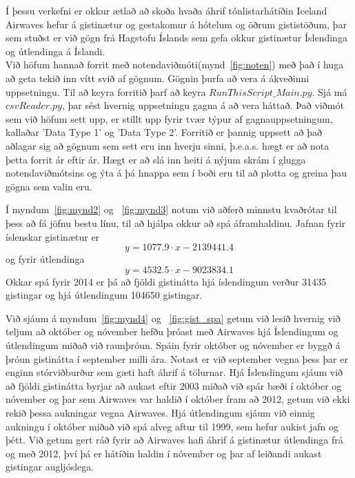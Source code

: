\documentclass[11pt,a4paper]{amsart}
\theoremstyle{plain}
\theoremstyle{definition}
\theoremstyle{remark}
\begin{document}



Í þessu verkefni er okkur ætlað að skoða hvaða áhrif tónlistarhátíðin Iceland Airwaves hefur á gistinætur og gestakomur á hótelum og öðrum gististöðum, þar sem stuðst er við gögn frá Hagstofu Íslands sem gefa okkur gistinætur Íslendinga og útlendinga á Íslandi.\\

Við höfum hannað forrit með notendaviðmóti(mynd~\ref{fig:noten}) með það í huga að geta tekið inn vítt svið af gögnum. Gögnin þurfa að vera á ákveðinni uppsetningu. Til að keyra forritið þarf að keyra $ RunThisScript\_Main.py $. Sjá má $ csvReader.py $, þar sést hvernig uppsetningu gagna á að vera háttað. Það viðmót sem við höfum sett upp, er stillt upp fyrir tvær týpur af gagnauppsetningum, kallaðar 'Data Type 1' og 'Data Type 2'. Forritið er þannig uppsett að það aðlagar sig að gögnum sem sett eru inn hverju sinni, þ.e.a.s. hægt er að nota þetta forrit ár eftir ár. Hægt er að slá inn heiti á nýjum skrám í glugga notendaviðmótsins og ýta á þá hnappa sem í boði eru til að plotta og greina þau gögna sem valin eru.\par

Í myndum~\ref{fig:mynd2} og ~\ref{fig:mynd3} notum við aðferð minnstu kvaðrótar til þess að fá jöfnu bestu línu, til að hjálpa okkur að spá áframhaldinu. Jafnan fyrir íslenskar gistinætur er $$ y = 1077.9 \cdot x - 2139441.4  $$ og fyrir útlendinga $$ y = 4532.5 \cdot x - 9023834.1 $$
Okkar spá fyrir 2014 er þá að fjöldi gistinátta hjá íslendingum verður 31435 gistingar og hjá útlendingum 104650 gistingar.

Við sjáum á myndum~\ref{fig:mynd4} og ~\ref{fig:gist_spa} getum við lesið hvernig við teljum að október og nóvember hefðu þróast með Airwaves hjá Íslendingum og útlendingum miðað við raunþróun. Spáin fyrir október og nóvember er byggð á þróun gistinátta í september milli ára. Notast er við september vegna þess þar er enginn stórviðburður sem gæti haft áhrif á tölurnar. Hjá Íslendingum sjáum við að fjöldi gistinátta byrjar að aukast eftir 2003 miðað við spár bæði í október og nóvember og þar sem Airwaves var haldið í október fram að 2012, getum við ekki rekið þessa aukningar vegna Airwaves. Hjá útlendingum sjáum við einnig aukningu í október miðað við spá alveg aftur til 1999, sem hefur aukist jafn og þétt. Við getum gert ráð fyrir að Airwaves hafi áhrif á gistinætur útlendinga frá og með 2012, því þá er hátíðin haldin í nóvember og þar af leiðandi aukast gistingar augljóslega.
\end{document}
